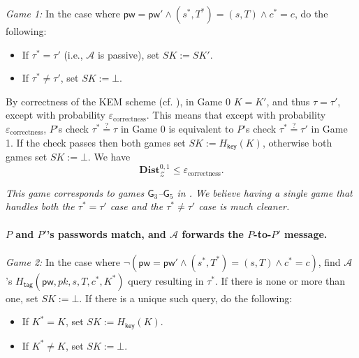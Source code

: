 \documentclass{article}
\theoremstyle{plain}
\theoremstyle{definition}
\theoremstyle{remark}
\newcommand{\adv}{\mathcal{A}}
\newcommand{\env}{\mathcal{Z}}
\newcommand{\Dist}{\mathbf{Dist}}
\newcommand{\Hkey}{H_\mathsf{key}}
\newcommand{\Htag}{H_\mathsf{tag}}
\newcommand{\pw}{\mathsf{pw}}
\begin{document}
\medskip\noindent\emph{Game 1:} In the case where $\pw = \pw' \land (s^*,T^*) = (s,T) \land c^* = c$, do the following:
\begin{itemize}
  \item If $\tau^* = \tau'$ (i.e., $\adv$ is passive), set $SK := SK'$.
  \item If $\tau^* \neq \tau'$, set $SK := \bot$.
\end{itemize}
By correctness of the KEM scheme (cf. ), in Game 0 $K = K'$, and thus $\tau = \tau'$, except with probability $\varepsilon_\text{correctness}$. This means that except with probability $\varepsilon_\text{correctness}$, $P$'s check $\tau^* \stackrel{?}{=} \tau$ in Game 0 is equivalent to $P$'s check $\tau^* \stackrel{?}{=} \tau'$ in Game 1. If the check passes then both games set $SK := \Hkey(K)$, otherwise both games set $SK := \bot$. We have
\[
\Dist_\env^{0,1} \leq \varepsilon_\text{correctness}.
\]

\emph{{\color{red}This game corresponds to games $\mathsf{G}_3$--$\mathsf{G}_5$ in \cite{EPRINT:ArrBarJar25}. We believe having a single game that handles both the $\tau^* = \tau'$ case and the $\tau^* \neq \tau'$ case is much cleaner.}}

\paragraph{$P$ and $P'$'s passwords match, and $\adv$ forwards the $P$-to-$P'$ message.}
\mbox{}

\medskip\noindent\emph{Game 2:} In the case where $\neg(\pw = \pw' \land (s^*,T^*) = (s,T) \land c^* = c)$, find $\adv$'s $\Htag(\pw,pk,s,T,c^*,K^*)$ query resulting in $\tau^*$. If there is none or more than one, set $SK := \bot$. If there is a unique such query, do the following:
\begin{itemize}
  \item If $K^* = K$, set $SK := \Hkey(K)$.
  \item If $K^* \neq K$, set $SK := \bot$.
\end{itemize}
\end{document}
